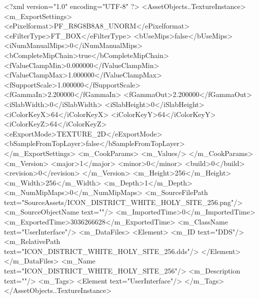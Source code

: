 <?xml version="1.0" encoding="UTF-8" ?>
<AssetObjects..TextureInstance>
	<m_ExportSettings>
		<ePixelformat>PF_R8G8B8A8_UNORM</ePixelformat>
		<eFilterType>FT_BOX</eFilterType>
		<bUseMips>false</bUseMips>
		<iNumManualMips>0</iNumManualMips>
		<bCompleteMipChain>true</bCompleteMipChain>
		<fValueClampMin>0.000000</fValueClampMin>
		<fValueClampMax>1.000000</fValueClampMax>
		<fSupportScale>1.000000</fSupportScale>
		<fGammaIn>2.200000</fGammaIn>
		<fGammaOut>2.200000</fGammaOut>
		<iSlabWidth>0</iSlabWidth>
		<iSlabHeight>0</iSlabHeight>
		<iColorKeyX>64</iColorKeyX>
		<iColorKeyY>64</iColorKeyY>
		<iColorKeyZ>64</iColorKeyZ>
		<eExportMode>TEXTURE_2D</eExportMode>
		<bSampleFromTopLayer>false</bSampleFromTopLayer>
	</m_ExportSettings>
	<m_CookParams>
		<m_Values/>
	</m_CookParams>
	<m_Version>
		<major>1</major>
		<minor>0</minor>
		<build>0</build>
		<revision>0</revision>
	</m_Version>
	<m_Height>256</m_Height>
	<m_Width>256</m_Width>
	<m_Depth>1</m_Depth>
	<m_NumMipMaps>0</m_NumMipMaps>
	<m_SourceFilePath text="SourceAssets/ICON_DISTRICT_WHITE_HOLY_SITE_256.png"/>
	<m_SourceObjectName text=""/>
	<m_ImportedTime>0</m_ImportedTime>
	<m_ExportedTime>3036266628</m_ExportedTime>
	<m_ClassName text="UserInterface"/>
	<m_DataFiles>
		<Element>
			<m_ID text="DDS"/>
			<m_RelativePath text="ICON_DISTRICT_WHITE_HOLY_SITE_256.dds"/>
		</Element>
	</m_DataFiles>
	<m_Name text="ICON_DISTRICT_WHITE_HOLY_SITE_256"/>
	<m_Description text=""/>
	<m_Tags>
		<Element text="UserInterface"/>
	</m_Tags>
</AssetObjects..TextureInstance>

